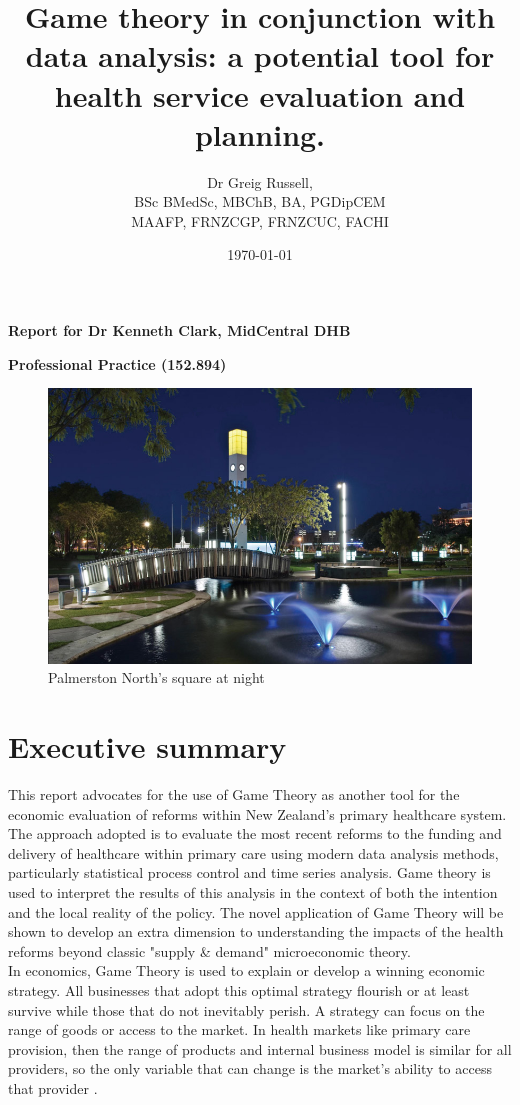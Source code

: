 \documentclass[11pt,a4paper]{article}
\title{\textbf{Game theory in conjunction with data analysis: a potential tool for health service evaluation and planning.}}
\author{Dr Greig Russell, \\ BSc BMedSc, MBChB, BA, PGDipCEM \\ MAAFP, FRNZCGP, FRNZCUC, FACHI}
\date{\today}
\begin{document}
\maketitle

\Large{\textbf{Report for Dr Kenneth Clark, MidCentral DHB}}


\Large{\textbf{Professional Practice (152.894)}}
\newline
\newline
\newline
\begin{figure}[htp]
\centering
\includegraphics[scale=0.6]{PN.png}
\caption{Palmerston North's square at night}
\label{}
\end{figure}


\pagebreak
\section{Executive summary}
This report advocates for the use of Game Theory as another tool for the economic evaluation of reforms within New Zealand's primary healthcare system. The approach adopted is to evaluate the most recent reforms to the funding and delivery of healthcare within primary care using modern data analysis methods, particularly statistical process control and time series analysis. Game theory is used to interpret the results of this analysis in the context of both the intention and the local reality of the policy. The novel application of Game Theory will be shown to develop an extra dimension to understanding the impacts of the health reforms beyond classic "supply \& demand" microeconomic theory.\\


In economics, Game Theory is used to explain or develop a winning economic strategy. All businesses that adopt this optimal strategy flourish or at least survive while those that do not inevitably perish. A strategy can focus on the range of goods or access to the market. In health markets like primary care provision, then the range of products and internal business model is similar for all providers, so the  only variable that can change is the market's ability to access that provider \citep{dinar2008game}. \\
\end{document}
